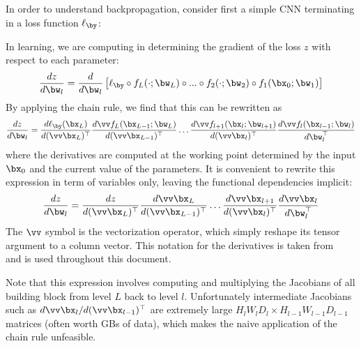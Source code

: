 In order to understand backpropagation, consider first a simple CNN terminating in a loss function $\ell_\by$:
\begin{center}
\end{center}
In learning, we are computing in determining the gradient of the loss $z$ with respect to each parameter:
\[
\frac{dz}{d\bw_l} = 
\frac{d}{d\bw_l}
\left[\ell_\by \circ f_L(\cdot;\bw_L) \circ ... \circ 
f_2(\cdot;\bw_2) \circ f_1(\bx_0;\bw_1)\right]
\]
By applying the chain rule, we find that this can be rewritten as
\[\label{e:chain-rule}
\frac{dz}{d\bw_l} 
= 
\frac{d\ell_\by(\bx_{L})}{d(\vv\bx_{L})^\top}
\frac{d\vv f_L(\bx_{L-1};\bw_{L})}{d(\vv\bx_{L-1})^\top}
\dots
\frac{d\vv f_{l+1}(\bx_{l};\bw_{l+1})}{d(\vv\bx_{l})^\top}
\frac{d\vv f_l(\bx_{l-1};\bw_{l})}{d\bw_l^\top}
\]
where the derivatives are computed at the working point determined by the input $\bx_0$ and the current value of the parameters. It is convenient to rewrite this expression in term of variables only, leaving the functional dependencies implicit:
\[\label{e:chain-rule}
\frac{dz}{d\bw_l} 
= 
\frac{dz}{d(\vv\bx_{L})^\top}
\frac{d\vv\bx_{L}}{d(\vv\bx_{L-1})^\top}
\dots
\frac{d\vv\bx_{l+1}}{d(\vv\bx_{l})^\top}
\frac{d\vv\bx_{l}}{d\bw_l^\top}
\]
The $\vv$ symbol is the vectorization operator, which simply reshape its tensor argument to a column vector. This notation for the derivatives is taken from~\cite{kinghorn96integrals} and is used throughout this document.

Note that this expression involves computing and multiplying the Jacobians of all building block from level $L$ back to level $l$.  Unfortunately intermediate Jacobians such as $d\vv \bx_l / d(\vv \bx_{l-1})^\top$ are extremely large $H_l W_l D_l  \times H_{l-1} W_{l-1} D_{l-1}$ matrices (often worth GBs of data), which makes the naive application of the chain rule unfeasible.

